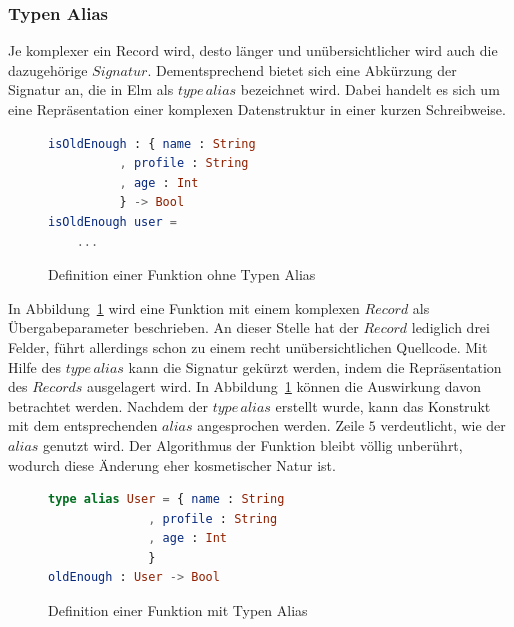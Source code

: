 \subsubsection{Typen Alias}
\label{sec:typ-alias}
Je komplexer ein Record wird, desto länger und unübersichtlicher wird auch die dazugehörige $Signatur$. Dementsprechend bietet sich eine Abkürzung der Signatur an, die in Elm als $type\,alias$ bezeichnet wird. Dabei handelt es sich um eine Repräsentation einer komplexen Datenstruktur in einer kurzen Schreibweise.
\begin{figure}[h]
\begin{lstlisting}[language=Elm]
isOldEnough : { name : String
	      , profile : String
	      , age : Int
	      } -> Bool
isOldEnough user =
	...
\end{lstlisting}
\caption{Definition einer Funktion ohne Typen Alias}\label{fig:no-type-alias}
\end{figure}
In Abbildung~\ref{fig:no-type-alias} wird eine Funktion mit einem komplexen $Record$ als Übergabeparameter beschrieben. An dieser Stelle hat der $Record$ lediglich drei Felder, führt allerdings schon zu einem recht unübersichtlichen Quellcode. Mit Hilfe des $type\,alias$ kann die Signatur gekürzt werden, indem die Repräsentation des $Records$ ausgelagert wird. In Abbildung~\ref{fig:no-type-alias} können die Auswirkung davon betrachtet werden. Nachdem der $type\,alias$ erstellt wurde, kann das Konstrukt mit dem entsprechenden $alias$ angesprochen werden. Zeile $5$ verdeutlicht, wie der $alias$ genutzt wird. Der Algorithmus der Funktion bleibt völlig unberührt, wodurch diese Änderung eher kosmetischer Natur ist.
\begin{figure}[h]
\begin{lstlisting}[language=Elm]
type alias User = { name : String
	          , profile : String
	          , age : Int
	          }
oldEnough : User -> Bool
\end{lstlisting}
\caption{Definition einer Funktion mit Typen Alias}\label{fig:type-alias}
\end{figure}


